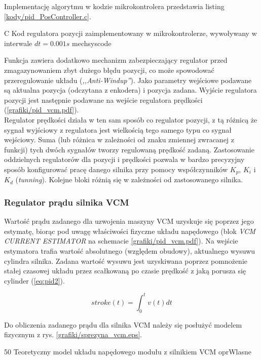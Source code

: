 Implementację algorytmu w kodzie mikrokontrolera przedstawia listing \ref{kody/pid_PosController.c}.

	{C}
	{Kod regulatora pozycji zaimplementowany w  mikrokontrolerze, wywoływany w interwale $ dt = 0.001 s $}
	{mechsyscode}
	
Funkcja zawiera dodatkowo mechanizm zabezpieczający regulator przed zmagazynowaniem zbyt dużego błędu pozycji, co może spowodować przeregulowanie układu ({\it ,,Anti-Windup''}). Jako parametry wejściowe podawane są aktualna pozycja (odczytana z enkodera) i pozycja zadana. Wyjście regulatora pozycji jest następnie podawane na wejście regulatora prędkości (\ref{grafiki/pid_vcm.pdf}). \\

Regulator prędkości działa w ten sam sposób co regulator pozycji, z tą różnicą że sygnał wyjściowy z regulatora jest wielkością tego samego typu co sygnał wejściowy. Suma (lub różnica w zależności od znaku zmiennej zwracanej z funkcji) tych dwóch sygnałów tworzy regulowaną prędkość zadaną. Zastosowanie oddzielnych regulatorów dla pozycji i prędkości pozwala w bardzo precyzyjny sposób konfigurować pracę danego silnika przy pomocy współczynników $ K_p $, $ K_i $ i $ K_d $ ({\it tunning}). Kolejne bloki różnią się w zależności od zastosowanego silnika.

\subsubsection{Regulator prądu silnika VCM}

Wartość prądu zadanego dla uzwojenia maszyny VCM uzyskuje się poprzez jego estymatę, biorąc pod uwagę właściwości fizyczne układu napędowego (blok {\it VCM CURRENT ESTIMATOR} na schemacie \ref{grafiki/pid_vcm.pdf}). Na wejście estymatora trafia wartość absolutnego (względem obudowy), aktualnego wysuwu cylindra silnika. Zadana wartość wysuwu jest uzyskiwana poprzez pomnożenie stałej czasowej układu przez scałkowaną po czasie prędkość z jaką porusza się cylinder (\ref{eq:pid2}).

\begin{equation} \label{eq:pid2}
	stroke(t) = \int_0^t v(t) dt
\end{equation}

Do obliczenia zadanego prądu dla silnika VCM należy się posłużyć modelem fizycznym z rys. \ref{grafiki/sprezyna_vcm.eps}.

	{50}
	{Teoretyczny model układu napędowego modułu z silnikiem VCM}
	{oprWlasne}
	
